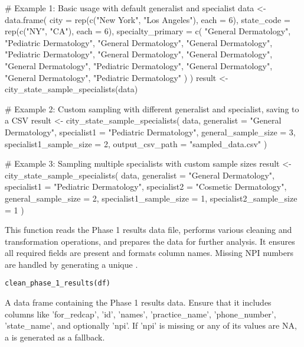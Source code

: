 \documentclass[a4paper]{book}
\begin{document}
%
\begin{Examples}
\begin{ExampleCode}
# Example 1: Basic usage with default generalist and specialist
data <- data.frame(
  city = rep(c("New York", "Los Angeles"), each = 6),
  state_code = rep(c("NY", "CA"), each = 6),
  specialty_primary = c(
    "General Dermatology", "Pediatric Dermatology", "General Dermatology",
    "General Dermatology", "Pediatric Dermatology", "General Dermatology",
    "General Dermatology", "General Dermatology", "Pediatric Dermatology",
    "General Dermatology", "General Dermatology", "Pediatric Dermatology"
  )
)
result <- city_state_sample_specialists(data)

# Example 2: Custom sampling with different generalist and specialist, saving to a CSV
result <- city_state_sample_specialists(
  data,
  generalist = "General Dermatology",
  specialist1 = "Pediatric Dermatology",
  general_sample_size = 3,
  specialist1_sample_size = 2,
  output_csv_path = "sampled_data.csv"
)

# Example 3: Sampling multiple specialists with custom sample sizes
result <- city_state_sample_specialists(
  data,
  generalist = "General Dermatology",
  specialist1 = "Pediatric Dermatology",
  specialist2 = "Cosmetic Dermatology",
  general_sample_size = 2,
  specialist1_sample_size = 1,
  specialist2_sample_size = 1
)

\end{ExampleCode}
\end{Examples}
%
\begin{Description}
This function reads the Phase 1 results data file, performs various cleaning
and transformation operations, and prepares the data for further analysis.
It ensures all required fields are present and formats column names. Missing
NPI numbers are handled by generating a unique .
\end{Description}
%
\begin{Usage}
\begin{verbatim}
clean_phase_1_results(df)
\end{verbatim}
\end{Usage}
%
\begin{Arguments}
\begin{ldescription}
\item[\code{df}] A data frame containing the Phase 1 results data. Ensure that it
includes columns like 'for\_redcap', 'id', 'names', 'practice\_name', 'phone\_number',
'state\_name', and optionally 'npi'. If 'npi' is missing or any of its values are NA,
a  is generated as a fallback.
\end{ldescription}
\end{Arguments}
\end{document}
